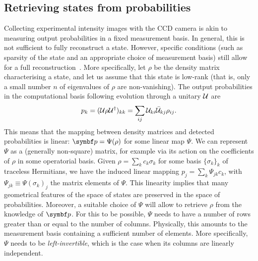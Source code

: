 

\subsection{Retrieving states from probabilities}

Collecting experimental intensity images with the \ac{CCD} camera is akin to measuring output probabilities in a fixed measurement basis.
In general, this is not sufficient to fully reconstruct a state.
However, specific conditions (such as sparsity of the state and an appropriate choice of measurement basis) still allow for a full reconstruction~\cite{banchi2018multiphoton}.
More specifically, let $\rho$ be the density matrix characterising a state, and let us assume that this state is low-rank (that is, only a small number $n$ of eigenvalues of $\rho$ are non-vanishing).
The output probabilities in the computational basis following evolution through a unitary ${\mathcal{U}}$ are
\begin{equation}
	p_k = ({\mathcal{U}}\rho{\mathcal{U}}^\dagger)_{kk}
	    = \sum_{ij}{\mathcal{U}}_{ki}\bar{{\mathcal{U}}}_{kj}\rho_{ij}.
\end{equation}
This means that the mapping between density matrices and detected probabilities is linear: $\bs p=\Psi(\rho)$ for some linear map $\Psi$.
We can represent $\Psi$ as a (generally non-square) matrix, for example via its action on the coefficients of $\rho$ in some operatorial basis.
Given $\rho=\sum_k c_k \sigma_k$ for some basis $\{\sigma_k\}_k$ of traceless Hermitians, we have the induced linear mapping $p_j = \sum_k \Psi_{jk}c_k$, with $\Psi_{jk}\equiv\Psi(\sigma_k)_j$ the matrix elements of $\Psi$.
This linearity implies that many geometrical features of the space of states are preserved in the space of probabilities. Moreover, a suitable choice of $\Psi$ will allow to retrieve $\rho$ from the knowledge of $\bs p$.
For this to be possible, $\Psi$ needs to have a number of rows greater than or equal to the number of columns. Physically, this amounts to the measurement basis containing a sufficient number of elements. More specifically, $\Psi$ needs to be \emph{left-invertible}, which is the case when its columns are linearly independent.

